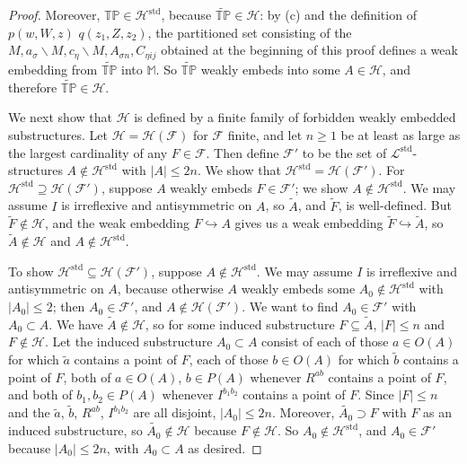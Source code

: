 \documentclass{amsart}
\theoremstyle{definition}
\theoremstyle{remark}
\numberwithin{equation}{section}
\begin{document}
\begin{proof}
     Moreover, $\mathbb{TP}\in \mathcal{H}^{\mathrm{std}}$, because $\widetilde{\mathbb{TP}} \in \mathcal{H}$: by (c) and the definition of $p(w, W, z)$ $q(z_{1}, Z, z_{2})$, the partitioned set consisting of the $M, a_{\sigma} \backslash M,c_{\eta} \backslash M, A_{\sigma n}, C_{\eta ij}$ obtained at the beginning of this proof defines a weak embedding from $\widetilde{\mathbb{TP}}$ into $\mathbb{M}$. So $\widetilde{\mathbb{TP}}$ weakly embeds into some $A \in \mathcal{H}$, and therefore  $\widetilde{\mathbb{TP}} \in \mathcal{H}$.


We next show that $\mathcal{H}$ is defined by a finite family of forbidden weakly embedded substructures. Let $\mathcal{H} = \mathcal{H}(\mathcal{F})$ for $\mathcal{F}$ finite, and let $n \geq 1$ be at least as large as the largest cardinality of any $F \in \mathcal{F}$. Then define $\mathcal{F}'$ to be the set of $\mathcal{L}^{\mathrm{std}}$-structures $A \notin \mathcal{H}^{\mathrm{std}}$ with $|A| \leq 2n$. We show that $\mathcal{H}^{\mathrm{std}} = \mathcal{H}(\mathcal{F}')$. For $\mathcal{H}^{\mathrm{std}} \supseteq \mathcal{H}(\mathcal{F}')$, suppose $A$ weakly embeds $F \in \mathcal{F}'$; we show $A \notin \mathcal{H}^{\mathrm{std}}$. We may assume $I$ is irreflexive and antisymmetric on $A$, so $\tilde{A}$, and $\tilde{F}$, is well-defined.  But $\tilde{F} \notin \mathcal{H}$, and the weak embedding $F\hookrightarrow A$ gives us a weak embedding $\tilde{F} \hookrightarrow \tilde{A}$, so $\tilde{A} \notin \mathcal{H}$ and $A \notin \mathcal{H}^{\mathrm{std}}$. 

To show $\mathcal{H}^{\mathrm{std}} \subseteq \mathcal{H} (\mathcal{F}')$, suppose $A \notin \mathcal{H}^{\mathrm{std}}$. We may assume $I$ is irreflexive and antisymmetric on $A$, because otherwise $A$ weakly embeds some $A_{0} \notin \mathcal{H}^{\mathrm{std}}$ with $|A_{0}| \leq 2$; then $A_{0} \in \mathcal{F}'$, and $A \notin \mathcal{H} (\mathcal{F}')$. We want to find $A_{0} \in \mathcal{F}'$ with $A_{0} \subset A$. We have  $\tilde{A} \notin \mathcal{H}$, so for some induced substructure $F \subseteq \tilde{A}$, $|F| \leq n$ and $F \notin\mathcal{H}$. Let the induced substructure $A_{0} \subset A$ consist of each of those $a \in O(A)$ for which $\tilde{a}$ contains a point of $F$, each of those $b \in O(A)$ for which $\tilde{b}$ contains a point of $F$, both of $a \in O(A)$, $b \in P(A)$ whenever $R^{ab}$ contains a point of $F$, and both of $b_1, b_2 \in P(A)$ whenever $I^{b_{1}b_{2}}$ contains a point of $F$. Since $|F| \leq n$ and the $\tilde{a}$, $\tilde{b}$, $R^{ab}$, $I^{b_{1}b_{2}}$ are all disjoint, $|A_{0}| \leq 2n$. Moreover, $\tilde{A_{0}} \supset F$ with $F$ as an induced substructure, so $\tilde{A_{0}} \notin \mathcal{H}$ because $F \notin\mathcal{H}$.  So $A_{0} \notin \mathcal{H}^{\mathrm{std}}$, and $A_{0} \in \mathcal{F}'$ because $|A_0| \leq 2n$, with $A_{0} \subset A$ as desired. 


\end{proof}
\end{document}

